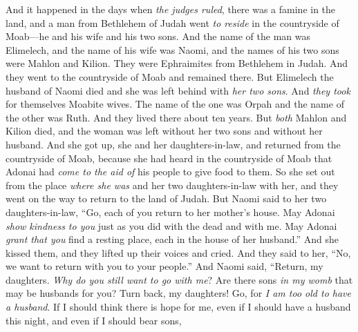 
\begin{biblechapter} %
 And it happened in the days when \textit{the judges ruled}, there was a famine in the land, and a man from Bethlehem of Judah went \textit{to reside} in the countryside of Moab—he and his wife and his two sons.
\verse And the name of the man was Elimelech, and the name of his wife was Naomi, and the names of his two sons were Mahlon and Kilion. They were Ephraimites from Bethlehem in Judah. And they went to the countryside of Moab and remained there.
\verse But Elimelech the husband of Naomi died and she was left behind with \textit{her two sons}.
\verse And \textit{they took} for themselves Moabite wives. The name of the one was Orpah and the name of the other was Ruth. And they lived there about ten years.
\verse But \textit{both} Mahlon and Kilion died, and the woman was left without her two sons and without her husband.
 And she got up, she and her daughters-in-law, and returned from the countryside of Moab, because she had heard in the countryside of Moab that Adonai had \textit{come to the aid of} his people to give food to them.
\verse So she set out from the place \textit{where she was} and her two daughters-in-law with her, and they went on the way to return to the land of Judah.
\verse But Naomi said to her two daughters-in-law, “Go, each of you return to her mother’s house. May Adonai \textit{show kindness to you} just as you did with the dead and with me.
\verse May Adonai \textit{grant that you} find a resting place, each in the house of her husband.” And she kissed them, and they lifted up their voices and cried.
\verse And they said to her, “No, we want to return with you to your people.”
\verse And Naomi said, “Return, my daughters. \textit{Why do you still want to go with me}? Are there sons \textit{in my womb} that may be husbands for you?
\verse Turn back, my daughters! Go, for \textit{I am too old to have a husband}. If I should think there is hope for me, even if I should have a husband this night, and even if I should bear sons,

\end{biblechapter}
